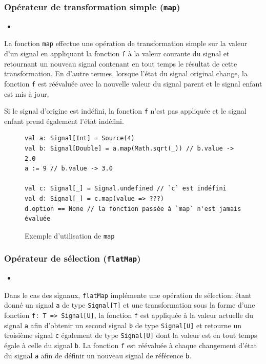 \subsubsection{Opérateur de transformation simple (\texttt{map})}

\begin{itemize}
	\item {}
\end{itemize}

La fonction \texttt{map} effectue une opération de transformation simple sur la valeur d'un signal en appliquant la fonction \texttt{f} à la valeur courante du signal et retournant un nouveau signal contenant en tout temps le résultat de cette transformation. En d'autre termes, lorsque l'état du signal original change, la fonction \texttt{f} est réévaluée avec la nouvelle valeur du signal parent et le signal enfant est mis à jour.

Si le signal d'origine est indéfini, la fonction \texttt{f} n'est pas appliquée et le signal enfant prend également l'état indéfini.

\begin{figure}[h]
	\begin{lstlisting}
val a: Signal[Int] = Source(4)
val b: Signal[Double] = a.map(Math.sqrt(_)) // b.value -> 2.0
a := 9 // b.value -> 3.0

val c: Signal[_] = Signal.undefined // `c` est indéfini
val d: Signal[_] = c.map(value => ???)
d.option == None // la fonction passée à `map` n'est jamais évaluée
	\end{lstlisting}
	\caption{Exemple d'utilisation de \texttt{map}}
\end{figure}

\subsubsection{Opérateur de sélection (\texttt{flatMap})}

\begin{itemize}
	\item {}
\end{itemize}

Dans le cas des signaux, \texttt{flatMap} implémente une opération de sélection: étant donné un signal \texttt{a} de type \texttt{Signal[T]} et une transformation sous la forme d'une fonction \texttt{f: T => Signal[U]}, la fonction \texttt{f} est appliquée à la valeur actuelle du signal \texttt{a} afin d'obtenir un second signal \texttt{b} de type \texttt{Signal[U]} et retourne un troisième signal \texttt{c} également de type \texttt{Signal[U]} dont la valeur est en tout temps égale à celle du signal \texttt{b}. La fonction \texttt{f} est réévaluée à chaque changement d'état du signal \texttt{a} afin de définir un nouveau signal de référence \texttt{b}.

